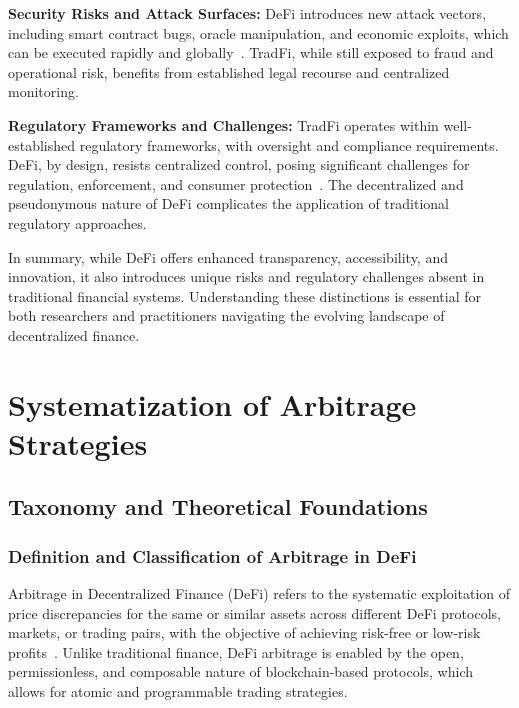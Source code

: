 \documentclass[conference]{IEEEtran}
\begin{document}
\textbf{Security Risks and Attack Surfaces:} DeFi introduces new attack vectors, including smart contract bugs, oracle manipulation, and economic exploits, which can be executed rapidly and globally~\cite{qin2022quantifying}. TradFi, while still exposed to fraud and operational risk, benefits from established legal recourse and centralized monitoring.

\textbf{Regulatory Frameworks and Challenges:} TradFi operates within well-established regulatory frameworks, with oversight and compliance requirements. DeFi, by design, resists centralized control, posing significant challenges for regulation, enforcement, and consumer protection~\cite{werner2021sok}. The decentralized and pseudonymous nature of DeFi complicates the application of traditional regulatory approaches.

In summary, while DeFi offers enhanced transparency, accessibility, and innovation, it also introduces unique risks and regulatory challenges absent in traditional financial systems. Understanding these distinctions is essential for both researchers and practitioners navigating the evolving landscape of decentralized finance.




\section{Systematization of Arbitrage Strategies}
\subsection{Taxonomy and Theoretical Foundations}

\subsubsection{Definition and Classification of Arbitrage in DeFi}
Arbitrage in Decentralized Finance (DeFi) refers to the systematic exploitation of price discrepancies for the same or similar assets across different DeFi protocols, markets, or trading pairs, with the objective of achieving risk-free or low-risk profits~\cite{xu2022sok}. Unlike traditional finance, DeFi arbitrage is enabled by the open, permissionless, and composable nature of blockchain-based protocols, which allows for atomic and programmable trading strategies.
\end{document}

